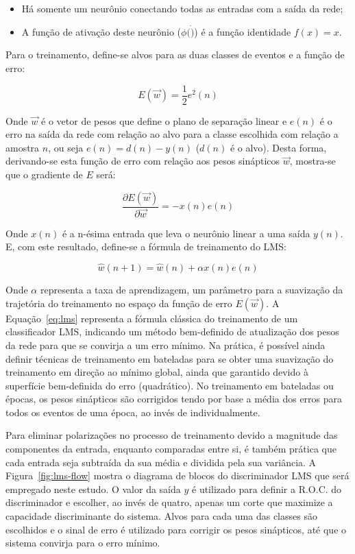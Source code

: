 \begin{itemize}
\item Há somente um neurônio conectando todas as entradas com a saída da rede;
\item A função de ativação deste neurônio ($\phi(\dot)$) é a função identidade
$f(x) = x$.
\end{itemize}

Para o treinamento, define-se alvos para as duas classes de eventos e a função
de erro:

\begin{equation}
E(\overrightarrow{w}) = \frac{1}{2} e^2(n)
\end{equation}

Onde $\overrightarrow{w}$ é o vetor de pesos que define o plano de separação
linear e $e(n)$ é o erro na saída da rede com relação ao alvo para a classe
escolhida com relação a amostra $n$, ou seja $e(n) = d(n)-y(n)$ ($d(n)$ é o
alvo). Desta forma, derivando-se esta função de erro com relação aos pesos
sinápticos $\overrightarrow{w}$, mostra-se que o gradiente de $E$ será:

\begin{equation}
\frac{\partial E(\overrightarrow{w})}{\partial \overrightarrow{w}} =
-x(n)e(n) 
\end{equation}

Onde $x(n)$ é a n-ésima entrada que leva o neurônio linear a uma saída
$y(n)$. E, com este resultado, define-se a fórmula de treinamento do LMS:

\begin{equation}
\hat{w}(n+1) = \hat{w}(n) + \alpha x(n)e(n)
\label{eq:lms}
\end{equation}

Onde $\alpha$ representa a taxa de aprendizagem, um parâmetro para a suavização
da trajetória do treinamento no espaço da função de erro
$E(\overrightarrow{w})$. A Equação~\ref{eq:lms} representa a fórmula clássica
do treinamento de um classificador LMS, indicando um método bem-definido de
atualização dos pesos da rede para que se convirja a um erro mínimo. Na
prática, é possível ainda definir técnicas de treinamento em bateladas para se
obter uma suavização do treinamento em direção ao mínimo global, ainda que
garantido devido à superfície bem-definida do erro (quadrático). No
treinamento em bateladas ou épocas, os pesos sinápticos são corrigidos 
tendo por base a média dos erros para todos os eventos de uma época, ao invés
de individualmente. 

Para eliminar polarizações no processo de treinamento devido a magnitude das
componentes da entrada, enquanto comparadas entre si, é também prática que
cada entrada seja subtraída da sua média e dividida pela sua variância. A
Figura~\ref{fig:lms-flow} mostra o diagrama de blocos do discriminador LMS que
será empregado neste estudo. O valor da saída $y$ é utilizado para definir a
R.O.C. do discriminador e escolher, ao invés de quatro, apenas um corte que
maximize a capacidade discriminante do sistema. Alvos para cada uma das
classes são escolhidos e o sinal de erro é utilizado para corrigir os pesos
sinápticos, até que o sistema convirja para o erro mínimo.


